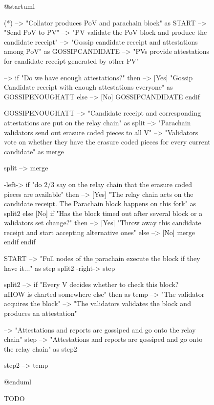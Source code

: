 \documentclass{book}
\begin{document}
\begin{figure}[h!]
\begin{plantuml}
@startuml

(*) --> "Collator produces PoV and parachain block" as START
--> "Send PoV to PV"
--> "PV validate the PoV block and produce the candidate receipt"
--> "Gossip candidate receipt and attestations among PoV" as GOSSIPCANDIDATE
--> "PVs provide attestations for candidate receipt generated by other PV"

--> if "Do we have enough attestations?" then
    --> [Yes] "Gossip Candidate receipt with enough attestations everyone" as GOSSIPENOUGHATT
else
    --> [No] GOSSIPCANDIDATE
endif

GOSSIPENOUGHATT --> "Candidate receipt and corresponding attestations are put on the relay chain" as split
--> "Parachain validators send out erasure coded pieces to all V"
--> "Validators vote on whether they have the erasure coded pieces for every current candidate" as merge

split --> merge

-left-> if "do 2/3 say on the relay chain that the erasure coded pieces are available" then
    --> [Yes] "The relay chain acts on the candidate receipt. The Parachain block happens on this fork" as split2
else
    [No] if "Has the block timed out after several block or a validators set change?" then
        --> [Yes] "Throw away this candidate receipt and start accepting alternative ones"
    else
        --> [No] merge
    endif
endif

START --> "Full nodes of the parachain execute the block if they have it..." as step
split2 -right-> step

split2 --> if "Every V decides whether to check this block?\\nHOW is charted somewhere else" then as temp
--> "The validator acquires the block"
--> "The validators validates the block and produces an attestation"

--> "Attestations and reports are gossiped and go onto the relay chain"
step --> "Attestations and reports are gossiped and go onto the relay chain" as step2

step2 --> temp


@enduml
\end{plantuml}
\caption{TODO}
\end{figure}
\end{document}
